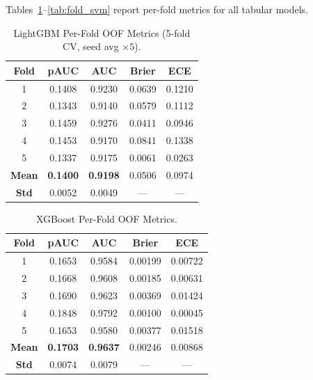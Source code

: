 \documentclass[conference]{IEEEtran}
\begin{document}
Tables~\ref{tab:fold_lgbm}--\ref{tab:fold_svm} report per-fold
metrics for all tabular models.

\begin{table}[!t]
  \centering
  \caption{LightGBM Per-Fold OOF Metrics (5-fold CV, seed avg $\times 5$).}
  \label{tab:fold_lgbm}
  \renewcommand{\arraystretch}{1.1}
  \begin{tabular}{ccccc}
    \toprule
    \textbf{Fold} & \textbf{pAUC} & \textbf{AUC} & \textbf{Brier} & \textbf{ECE} \\
    \midrule
    1 & 0.1408 & 0.9230 & 0.0639 & 0.1210 \\
    2 & 0.1343 & 0.9140 & 0.0579 & 0.1112 \\
    3 & 0.1459 & 0.9276 & 0.0411 & 0.0946 \\
    4 & 0.1453 & 0.9170 & 0.0841 & 0.1338 \\
    5 & 0.1337 & 0.9175 & 0.0061 & 0.0263 \\
    \midrule
    \textbf{Mean} & \textbf{0.1400} & \textbf{0.9198} & 0.0506 & 0.0974 \\
    \textbf{Std}  & 0.0052 & 0.0049 & --- & --- \\
    \bottomrule
  \end{tabular}
\end{table}

\begin{table}[!t]
  \centering
  \caption{XGBoost Per-Fold OOF Metrics.}
  \label{tab:fold_xgb}
  \renewcommand{\arraystretch}{1.1}
  \begin{tabular}{ccccc}
    \toprule
    \textbf{Fold} & \textbf{pAUC} & \textbf{AUC} & \textbf{Brier} & \textbf{ECE} \\
    \midrule
    1 & 0.1653 & 0.9584 & 0.00199 & 0.00722 \\
    2 & 0.1668 & 0.9608 & 0.00185 & 0.00631 \\
    3 & 0.1690 & 0.9623 & 0.00369 & 0.01424 \\
    4 & 0.1848 & 0.9792 & 0.00100 & 0.00045 \\
    5 & 0.1653 & 0.9580 & 0.00377 & 0.01518 \\
    \midrule
    \textbf{Mean} & \textbf{0.1703} & \textbf{0.9637} & 0.00246 & 0.00868 \\
    \textbf{Std}  & 0.0074 & 0.0079 & --- & --- \\
    \bottomrule
  \end{tabular}
\end{table}
\end{document}
